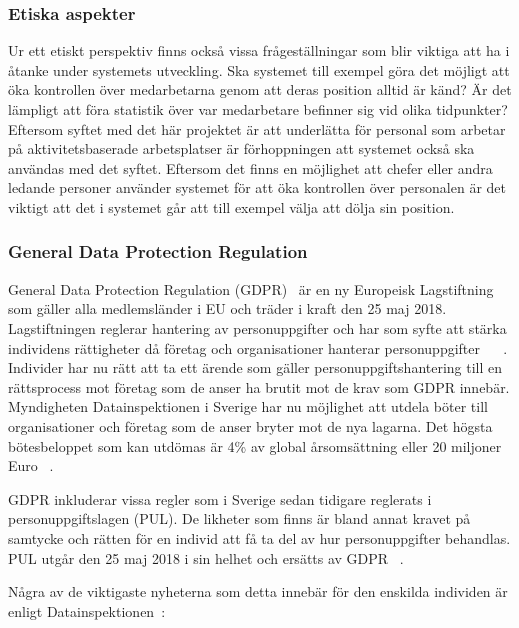 \documentclass[a4paper,12pt]{article}
\begin{document}
 \subsubsection{Etiska aspekter}
 Ur ett etiskt perspektiv finns också vissa frågeställningar som blir viktiga att ha i åtanke under systemets utveckling. Ska systemet till exempel göra det möjligt att öka kontrollen över medarbetarna genom att deras position alltid är känd? Är det lämpligt att föra statistik över var medarbetare befinner sig vid olika tidpunkter? Eftersom syftet med det här projektet är att underlätta för personal som arbetar på aktivitetsbaserade arbetsplatser är förhoppningen att systemet också ska användas med det syftet. Eftersom det finns en möjlighet att chefer eller andra ledande personer använder systemet för att öka kontrollen över personalen är det viktigt att det i systemet går att till exempel välja att dölja sin position.

 \subsubsection{General Data Protection Regulation}\label{GDPR}
 General Data Protection Regulation (GDPR)~\cite{GDPRdatainspektionen} är en ny Europeisk Lagstiftning som gäller alla medlemsländer i EU och träder i kraft den 25 maj 2018.
 Lagstiftningen reglerar hantering av personuppgifter och har som syfte att stärka individens rättigheter då företag och organisationer hanterar personuppgifter ~\cite{GDPRibm} ~\cite{GDPRdatainspektionen}.
 Individer har nu rätt att ta ett ärende som gäller personuppgiftshantering till en rättsprocess mot företag som de anser ha brutit mot de krav som GDPR innebär.
 Myndigheten Datainspektionen i Sverige har nu möjlighet att utdela böter till organisationer och företag som de anser bryter mot de nya lagarna. Det högsta bötesbeloppet som kan utdömas är 4\% av global årsomsättning eller 20 miljoner Euro ~\cite{GDPRibm}.

 GDPR inkluderar vissa regler som i Sverige sedan tidigare reglerats i personuppgiftslagen (PUL). De likheter som finns är bland annat kravet på samtycke och rätten för en individ att få ta del av hur personuppgifter behandlas. PUL utgår den 25 maj 2018 i sin helhet och ersätts av GDPR ~\cite{GDPRdatainspektionen}.

 Några av de viktigaste nyheterna som detta innebär för den enskilda individen är enligt Datainspektionen~\cite{GDPRdatainspektionen}:

\end{document}
